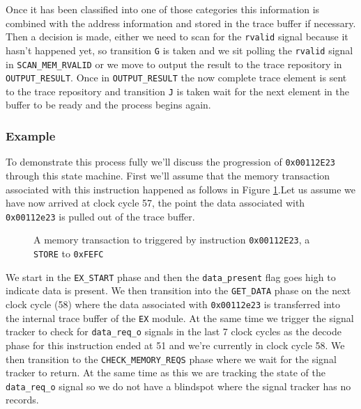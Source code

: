 Once it has been classified into one of those categories this information is combined with the address information and stored in the trace buffer if necessary. Then a decision is made, either we need to scan for the \texttt{rvalid} signal because it hasn't happened yet, so transition \texttt{G} is taken and we sit polling the \texttt{rvalid} signal in \texttt{SCAN\_MEM\_RVALID} or we move to output the result to the trace repository in \texttt{OUTPUT\_RESULT}. Once in \texttt{OUTPUT\_RESULT} the now complete trace element is sent to the trace repository and transition \texttt{J} is taken wait for the next element in the buffer to be ready and the process begins again.

\subsubsection{Example}

To demonstrate this process fully we'll discuss the progression of \texttt{0x00112E23} through this state machine. First we'll assume that the memory transaction associated with this instruction happened as follows in Figure \ref{fig:ex-tracker-example-memory-transaction}.Let us assume we have now arrived at clock cycle 57, the point the data associated with \texttt{0x00112e23} is pulled out of the trace buffer.

\begin{figure}[htbp]
	
	\caption{A memory transaction to triggered by instruction \texttt{0x00112E23}, a \texttt{STORE} to \texttt{0xFEFC}}
	\label{fig:ex-tracker-example-memory-transaction}
\end{figure}

We start in the \texttt{EX\_START} phase and then the \texttt{data\_present} flag goes high to indicate data is present. We then transition into the \texttt{GET\_DATA} phase on the next clock cycle (58) where the data associated with \texttt{0x00112e23} is transferred into the internal trace buffer of the \texttt{EX} module. At the same time we trigger the signal tracker to check for \texttt{data\_req\_o} signals in the last 7 clock cycles as the decode phase for this instruction ended at 51 and we're currently in clock cycle 58. We then transition to the \texttt{CHECK\_MEMORY\_REQS} phase where we wait for the signal tracker to return. At the same time as this we are tracking the state of the \texttt{data\_req\_o} signal so we do not have a blindspot where the signal tracker has no records. 

